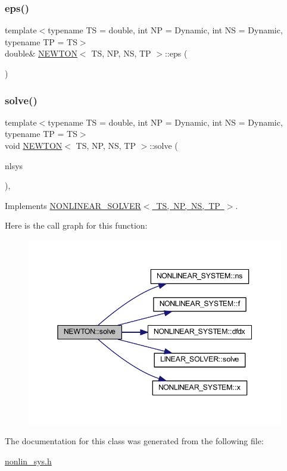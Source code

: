 \subsubsection{\texorpdfstring{eps()}{eps()}}
{\footnotesize\ttfamily template$<$typename TS  = double, int NP = Dynamic, int NS = Dynamic, typename TP  = TS$>$ \\
double\& \mbox{\hyperlink{class_n_e_w_t_o_n}{N\+E\+W\+T\+ON}}$<$ TS, NP, NS, TP $>$\+::eps (\begin{DoxyParamCaption}{ }\end{DoxyParamCaption})\hspace{0.3cm}{\ttfamily [inline]}}

\mbox{\label{class_n_e_w_t_o_n_a1dd31b882567d3e0427eb53ce169f0ce}} 
\subsubsection{\texorpdfstring{solve()}{solve()}}
{\footnotesize\ttfamily template$<$typename TS  = double, int NP = Dynamic, int NS = Dynamic, typename TP  = TS$>$ \\
void \mbox{\hyperlink{class_n_e_w_t_o_n}{N\+E\+W\+T\+ON}}$<$ TS, NP, NS, TP $>$\+::solve (\begin{DoxyParamCaption}\item[{\mbox{\hyperlink{class_n_o_n_l_i_n_e_a_r___s_y_s_t_e_m}{N\+O\+N\+L\+I\+N\+E\+A\+R\+\_\+\+S\+Y\+S\+T\+EM}}$<$ TS, NP, NS, TP $>$ \&}]{nlsys }\end{DoxyParamCaption})\hspace{0.3cm}{\ttfamily [inline]}, {\ttfamily [virtual]}}



Implements \mbox{\hyperlink{class_n_o_n_l_i_n_e_a_r___s_o_l_v_e_r_aae333fb75e2d5d8baa0e37991bfac7c4}{N\+O\+N\+L\+I\+N\+E\+A\+R\+\_\+\+S\+O\+L\+V\+E\+R$<$ T\+S, N\+P, N\+S, T\+P $>$}}.

Here is the call graph for this function\+:\nopagebreak
\begin{figure}[H]
\begin{center}
\leavevmode
\includegraphics[width=345pt]{class_n_e_w_t_o_n_a1dd31b882567d3e0427eb53ce169f0ce_cgraph}
\end{center}
\end{figure}


The documentation for this class was generated from the following file\+:\begin{DoxyCompactItemize}
\item 
\mbox{\hyperlink{nonlin__sys_8h}{nonlin\+\_\+sys.\+h}}\end{DoxyCompactItemize}
